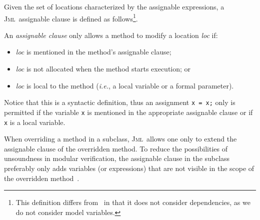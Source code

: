 \documentclass[a4paper]{llncs}
\newcommand{\defn}[1]{\:\hat{#1}\:}
\newcommand{\jml}{\textsc{Jml}}
\begin{document}
Given the set of locations characterized by the assignable
expressions, a \jml\ assignable clause is defined as
follows\footnote{This definition differs
from~\cite{LeavensBR00} in that it does not consider dependencies, 
as we do not consider model variables.}.
\begin{definition}
\label{def-mod}
An \emph{assignable clause} only allows a method to modify a location
\emph{loc} if:
\begin{itemize}
\item \emph{loc} is mentioned in the method's assignable
clause;
\item \emph{loc} is not allocated when the method starts execution; or
\item \emph{loc} is local to the method (\emph{i.e.}, a local
variable or a formal parameter).
\end{itemize}
\end{definition}

Notice that this is a syntactic definition, thus an assignment
\texttt{x = x;} only is permitted if the 
variable \texttt{x} is mentioned in the appropriate assignable clause
or if \texttt{x} is a local variable.

When overriding a method in a subclass, \jml\ allows one only to
extend the assignable clause of the overridden method. To reduce the
possibilities of unsoundness in modular verification, the assignable
clause in the subclass preferably only adds variables (or expressions)
that are not visible in the scope of the overridden
method~\cite{LeinoNS00,Leino98}.




\end{document}
